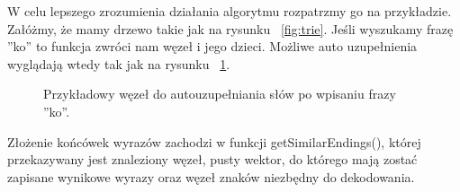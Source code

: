 \documentclass[twoside,a4paper]{book}
\begin{document}
W celu lepszego zrozumienia działania algorytmu rozpatrzmy go na przykładzie. Załóżmy, że mamy drzewo takie jak na rysunku ~\ref{fig:trie}. Jeśli wyszukamy frazę ''ko'' to funkcja zwróci nam węzeł i jego dzieci. Możliwe auto uzupełnienia wyglądają wtedy tak jak na rysunku ~\ref{fig:trieKO}.
\begin{figure}[!h]
		\centering
		\caption{Przykładowy węzeł do autouzupełniania słów po wpisaniu frazy ''ko''. }
		\label{fig:trieKO}
		\end{figure}
Złożenie końcówek wyrazów zachodzi w funkcji getSimilarEndings(), której przekazywany jest znaleziony
 węzeł, pusty wektor, do którego mają zostać zapisane wynikowe wyrazy oraz węzeł znaków niezbędny do dekodowania. 
\end{document}
